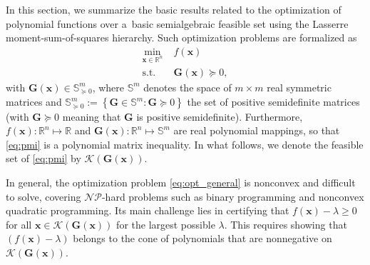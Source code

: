 \documentclass[final,onefignum,onetabnum]{siamart220329}
\begin{document}
In this section, we summarize the basic results related to the optimization of polynomial functions over a~basic semialgebraic feasible set using the Lasserre moment-sum-of-squares hierarchy. Such optimization problems are formalized as
%
\begin{subequations}\label{eq:opt_general}
\begin{align}
	\min_{\mathbf{x} \in \mathbb{R}^n}\; & f(\mathbf{x})\\
	\mathrm{s.t.}\; & \mathbf{G}(\mathbf{x}) \succeq 0,\label{eq:pmi}
\end{align}
\end{subequations}
%
with $\mathbf{G}(\mathbf{x}) \in \mathbb{S}^m_{\succeq 0}$, where $\mathbb{S}^{m}$ denotes the space of $m\times m$ real symmetric matrices and $\mathbb{S}^{m}_{\succeq 0} := \left\{\mathbf{G}\in\mathbb{S}^{m} : \mathbf{G}\succeq 0\right\}$ the set of positive semidefinite matrices (with $\mathbf{G}\succeq 0$ meaning that $\mathbf{G}$ is positive semidefinite). Furthermore, $f(\mathbf{x}): \mathbb{R}^n \mapsto \mathbb{R}$ and $\mathbf{G}(\mathbf{x}): \mathbb{R}^{n}\mapsto \mathbb{S}^{m}$ are real polynomial mappings, so that \eqref{eq:pmi} is a polynomial matrix inequality. In what follows, we denote the feasible set of \eqref{eq:pmi} by $\mathcal{K}(\mathbf{G}(\mathbf{x}))$.

{In general, the optimization problem \eqref{eq:opt_general} is nonconvex and difficult to solve, covering $\mathcal{NP}$-hard problems such as binary programming and nonconvex quadratic programming. Its main challenge lies in certifying that $f(\mathbf{x}) - \lambda \geq 0$ for all $\mathbf{x} \in \mathcal{K}(\mathbf{G}(\mathbf{x}))$ for the largest possible $\lambda$. This requires showing that $(f(\mathbf{x})-\lambda)$ belongs to the cone of polynomials that are nonnegative on $\mathcal{K}(\mathbf{G}(\mathbf{x}))$.}
\end{document}
